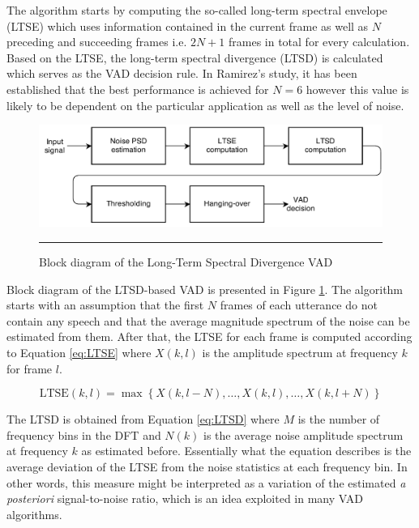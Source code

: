 The algorithm starts by computing the so-called long-term spectral envelope (LTSE) which uses information contained in the current frame as well as $N$ preceding and succeeding frames i.e. $2N+1$ frames in total for every calculation. Based on the LTSE, the long-term spectral divergence (LTSD) is calculated which serves as the VAD decision rule. In Ramirez's study, it has been established that the best performance is achieved for $N=6$ however this value is likely to be dependent on the particular application as well as the level of noise.

\begin{figure}[htbp]
	\centering
		\includegraphics[width=0.9\columnwidth]{Figures/LTSD.png}
		\rule{37em}{0.5pt}
	\caption[Block diagram of the Long-Term Spectral Divergence VAD]{Block diagram of the Long-Term Spectral Divergence VAD \cite{LTSD}}
	\label{fig:LTSD}
\end{figure}

Block diagram of the LTSD-based VAD is presented in Figure \ref{fig:LTSD}. The algorithm starts with an assumption that the first $N$ frames of each utterance do not contain any speech and that the average magnitude spectrum of the noise can be estimated from them. After that, the LTSE for each frame is computed according to Equation \ref{eq:LTSE} where $X(k,l)$ is the amplitude spectrum at frequency $k$ for frame $l$.

\begin{equation}
\text{LTSE}(k,l) = \max \left \{ X(k,l-N),\ldots,X(k,l),\ldots,X(k,l+N) \right \}
\label{eq:LTSE}
\end{equation}

The LTSD is obtained from Equation \ref{eq:LTSD} where $M$ is the number of frequency bins in the DFT and $N(k)$ is the average noise amplitude spectrum at frequency $k$ as estimated before. Essentially what the equation describes is the average deviation of the LTSE from the noise statistics at each frequency bin. In other words, this measure might be interpreted as a variation of the estimated \emph{a posteriori} signal-to-noise ratio, which is an idea exploited in many VAD algorithms.

